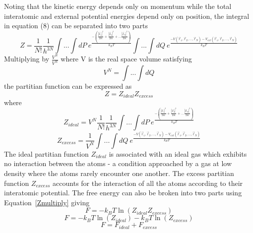 \documentclass[double,12pt]{beavtex}
\begin{document}
Noting that the kinetic energy depends only on momentum while the total 
interatomic and external potential energies depend only on position, 
the integral in equation (8) can be separated into two parts 
\begin{equation}{Z=\frac{1}{N!}\frac{1}{h^{3N}}\int...\int{dP}~e^\frac{-(\frac{|\vec{p}_1|^2}{2m}+\frac{|\vec{p}_2|^2}{2m}+...\frac{|\vec{p}_N|^2}{2m})}{k_BT}\int...\int{dQ}~e^\frac{-V(\vec{r}_1,\vec{r}_2,{...},\vec{r}_N)-V_{ext}(\vec{r}_1,\vec{r}_2,{...},\vec{r}_N)}{k_BT}}\end{equation}  Multiplying by $\frac{V^N}{V^N}$ where V is the real space volume satisfying \begin{equation}{V^N=}\int{...}\int{dQ}\end{equation} 
the partitian function can be expressed as
\begin{equation}\label{Zmultiply}{Z=Z_{ideal}Z_{excess}}\end{equation}
where
\begin{equation}{Z_{ideal}=V^N\frac{1}{N!}\frac{1}{h^{3N}}\int{...}\int{dP}~e^\frac{-(\frac{|\vec{p}_1|^2}{2m}+ \frac{|\vec{p}_2|^2}{2m}+...\frac{|\vec{p}_N|^2}{2m})}{k_BT}}\end{equation}
\begin{equation}{Z_{excess}=\frac{1}{V^N}\int{...}\int{dQ}~e^\frac{-V(\vec{r}_1,\vec{r}_2,{...},\vec{r}_N)-V_{ext}(\vec{r}_1,\vec{r}_2,{...},\vec{r}_N )}{k_BT}}\end{equation} The ideal partitian function $Z_{ideal}$ is associated with an ideal gas which exhibits no interaction between the atoms - a condition approached by a gas at low density where the atoms rarely encounter one another. The excess partitian function $Z_{excess}$ accounts for the interaction of all the atoms according to their interatomic potential. The free energy can also be broken into two parts using Equation~\ref{Zmultiply} giving
\begin{equation}{F=-k_{B}T\ln(Z_{ideal}Z_{excess})}\end{equation}
\begin{equation}{F=-k_{B}T\ln(Z_{ideal})-k_{B}T\ln(Z_{excess})}\end{equation}
\begin{equation}{F=F_{ideal} + F_{excess}}\end{equation} 
\end{document}
